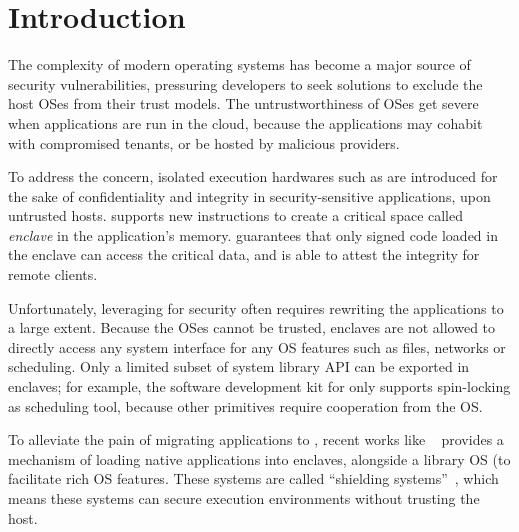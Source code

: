 \section{Introduction}

The complexity of modern operating systems has become
a major source of security vulnerabilities,
pressuring developers to seek solutions to exclude the host OSes
from their trust models.
The untrustworthiness of OSes get severe when applications are run in the cloud,
because the applications may cohabit with compromised tenants,
or be hosted by malicious providers.

To address the concern,
isolated execution hardwares such as \sgx{} are introduced
for the sake of confidentiality and integrity in
security-sensitive applications,
upon untrusted hosts.
\sgx{} supports new instructions to create a
critical space called {\it enclave} in the application's memory.
\sgx{} guarantees that only signed code loaded in the enclave can access the critical data,
and is able to attest the integrity for remote clients.


Unfortunately, leveraging \sgx{} for security
often requires rewriting the applications to a large extent.
Because the OSes cannot be trusted,
enclaves are not allowed to directly access any system interface
for any OS features
such as files, networks or scheduling.
Only a limited subset of system library API can be exported in enclaves;
for example, the software development kit for \sgx{}
only supports spin-locking as scheduling tool,
because other primitives require cooperation from the OS.

To alleviate the pain of migrating applications to \sgx{},
recent works like \haven{}~\cite{baumann14haven} provides a mechanism
of loading native applications into enclaves,
alongside a library OS (\libos{) }to facilitate rich OS features.
These systems are called ``shielding systems''~\cite{xu15controlledchannel},
which means these systems can secure execution environments
without trusting the host.

